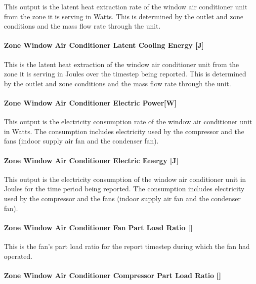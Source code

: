 This output is the latent heat extraction rate of the window air conditioner unit from the zone it is serving in Watts. This is determined by the outlet and zone conditions and the mass flow rate through the unit.

\paragraph{Zone Window Air Conditioner Latent Cooling Energy {[}J{]}}\label{zone-window-air-conditioner-latent-cooling-energy-j}

This is the latent heat extraction of the window air conditioner unit from the zone it is serving in Joules over the timestep being reported. This is determined by the outlet and zone conditions and the mass flow rate through the unit.

\paragraph{Zone Window Air Conditioner Electric Power{[}W{]}}\label{zone-window-air-conditioner-electric-powerw}

This output is the electricity consumption rate of the window air conditioner unit in Watts. The consumption includes electricity used by the compressor and the fans (indoor supply air fan and the condenser fan).

\paragraph{Zone Window Air Conditioner Electric Energy {[}J{]}}\label{zone-window-air-conditioner-electric-energy-j}

This output is the electricity consumption of the window air conditioner unit in Joules for the time period being reported. The consumption includes electricity used by the compressor and the fans (indoor supply air fan and the condenser fan).

\paragraph{Zone Window Air Conditioner Fan Part Load Ratio {[]}}\label{zone-window-air-conditioner-fan-part-load-ratio}

This is the fan's part load ratio for the report timestep during which the fan had operated.

\paragraph{Zone Window Air Conditioner Compressor Part Load Ratio {[]}}\label{zone-window-air-conditioner-compressor-part-load-ratio}

